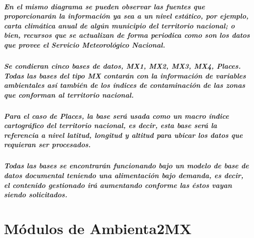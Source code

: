     \paragraph{En el mismo diagrama se pueden observar las fuentes que proporcionarán la información ya sea a un nivel estático, por ejemplo, carta climática anual de algún municipio del territorio nacional; o bien, recursos que se actualizan de forma periodica como son los datos que provee el Servicio Meteorológico Nacional.}
    \paragraph{Se condieran cinco bases de datos, \emph{MX1, MX2, MX3, MX4, Places}. Todas las bases del tipo MX contarán con la información de variables ambientales así también de los índices de contaminación de las zonas que conforman al territorio nacional.}
    \paragraph{Para el caso de \emph{Places}, la base será usada como un macro índice cartográfico del territorio nacional, es decir, esta base será la referencia a nivel latitud, longitud y altitud para ubicar los datos que requieran ser procesados.}
    \paragraph{Todas las bases se encontrarán funcionando bajo un modelo de base de datos documental teniendo una alimentación bajo demanda, es decir, el contenido gestionado irá aumentando conforme las éstos vayan siendo solicitados.}
\chapter{Módulos de Ambienta2MX}
    
    
    
    
    